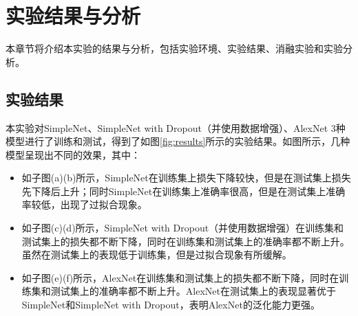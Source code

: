\section{实验结果与分析}

本章节将介绍本实验的结果与分析，包括实验环境、实验结果、消融实验和实验分析。

\subsection{实验结果}

本实验对SimpleNet、SimpleNet with Dropout（并使用数据增强）、AlexNet 3种模型进行了训练和测试，得到了如图\ref{fig:results}所示的实验结果。如图所示，几种模型呈现出不同的效果，其中：

\begin{itemize}
    \item 如子图(a)(b)所示，SimpleNet在训练集上损失下降较快，但是在测试集上损失先下降后上升；同时SimpleNet在训练集上准确率很高，但是在测试集上准确率较低，出现了过拟合现象。
    \item 如子图(c)(d)所示，SimpleNet with Dropout（并使用数据增强）在训练集和测试集上的损失都不断下降，同时在训练集和测试集上的准确率都不断上升。虽然在测试集上的表现低于训练集，但是过拟合现象有所缓解。
    \item 如子图(e)(f)所示，AlexNet在训练集和测试集上的损失都不断下降，同时在训练集和测试集上的准确率都不断上升。AlexNet在测试集上的表现显著优于SimpleNet和SimpleNet with Dropout，表明AlexNet的泛化能力更强。
\end{itemize}

